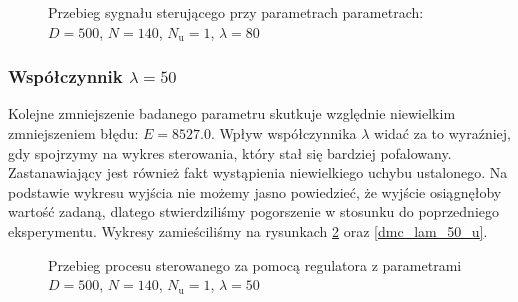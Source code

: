 \begin{figure}[b]
    \centering
    \caption{Przebieg sygnału sterującego przy parametrach parametrach: $D = 500$, $N = 140$, $N_{\mathrm{u}} = 1$, $\lambda = 80$}
    \label{dmc_lam_80_u}
\end{figure}

\subsubsection{Współczynnik $\lambda = 50$}
Kolejne zmniejszenie badanego parametru skutkuje względnie niewielkim zmniejszeniem błędu: $E = \num{8527,0}$. Wpływ współczynnika $\lambda$ widać za to wyraźniej, gdy spojrzymy na wykres sterowania, który stał się bardziej pofalowany. Zastanawiający jest również fakt wystąpienia niewielkiego uchybu ustalonego. Na podstawie wykresu wyjścia nie możemy jasno powiedzieć, że wyjście osiągnęłoby wartość zadaną, dlatego stwierdziliśmy pogorszenie w stosunku do poprzedniego eksperymentu. Wykresy zamieściliśmy na rysunkach \ref{dmc_lam_50_y} oraz \ref{dmc_lam_50_u}.

\begin{figure}[t]
    \centering
    \caption{Przebieg procesu sterowanego za pomocą regulatora z parametrami $D = 500$, $N = 140$, $N_{\mathrm{u}} = 1$, $\lambda = 50$}
    \label{dmc_lam_50_y}
\end{figure}

